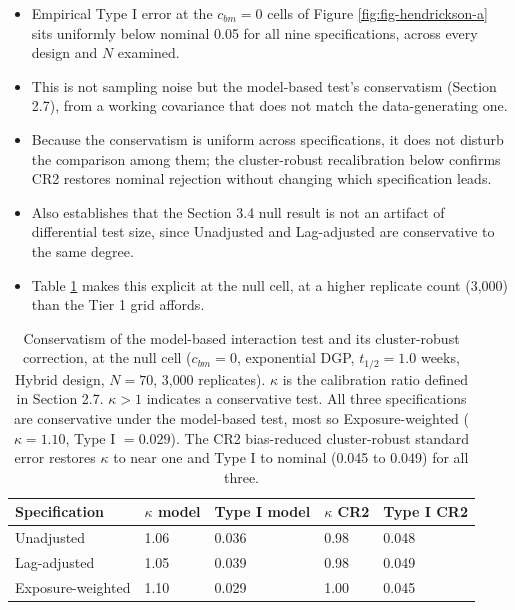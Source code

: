 \documentclass[
  11pt,
]{article}
\providecommand{\tightlist}{%
  \setlength{\itemsep}{0pt}\setlength{\parskip}{0pt}}
\begin{document}
\begin{itemize}
\tightlist
\item
  Empirical Type I error at the \(c_{bm}=0\) cells of Figure
  \ref{fig:fig-hendrickson-a} sits uniformly below nominal 0.05 for
  all nine specifications, across every design and \(N\) examined.
\item
  This is not sampling noise but the model-based test's conservatism
  (Section 2.7), from a working covariance that does not match the
  data-generating one.
\item
  Because the conservatism is uniform across specifications, it does
  not disturb the comparison among them; the cluster-robust
  recalibration below confirms CR2 restores nominal rejection without
  changing which specification leads.
\item
  Also establishes that the Section 3.4 null result is not an
  artifact of differential test size, since Unadjusted and
  Lag-adjusted are conservative to the same degree.
\item
  Table \ref{tab:tab-type1-cr2} makes this explicit at the null cell,
  at a higher replicate count (3,000) than the Tier 1 grid affords.
\end{itemize}

\begin{table}

\caption{\label{tab:tab-type1-cr2}Conservatism of the model-based interaction test and its
    cluster-robust correction, at the null cell ($c_{bm} = 0$,
    exponential DGP, $t_{1/2} = 1.0$ weeks, Hybrid design, $N = 70$,
    3{,}000 replicates).
    $\kappa$ is the calibration ratio defined in Section 2.7.
    $\kappa > 1$ indicates a conservative
    test. All three specifications are conservative under the
    model-based test, most so Exposure-weighted ($\kappa = 1.10$,
    Type I $= 0.029$). The CR2 bias-reduced cluster-robust standard
    error restores $\kappa$ to near one and Type I to nominal (0.045
    to 0.049) for all three.}
\centering
\begin{tabular}[t]{lllll}
\toprule
Specification & $\kappa$ model & Type I model & $\kappa$ CR2 & Type I CR2\\
\midrule
Unadjusted & 1.06 & 0.036 & 0.98 & 0.048\\
Lag-adjusted & 1.05 & 0.039 & 0.98 & 0.049\\
Exposure-weighted & 1.10 & 0.029 & 1.00 & 0.045\\
\bottomrule
\end{tabular}
\end{table}
\end{document}
